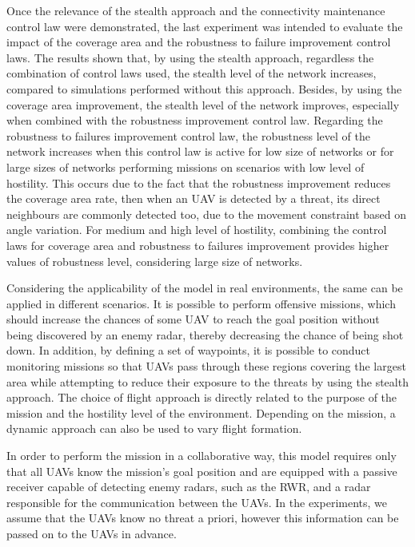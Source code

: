 Once the relevance of the stealth approach and the connectivity maintenance control law were demonstrated, the last experiment was intended to evaluate the impact of the coverage area and the robustness to failure improvement control laws. The results shown that, by using the stealth approach, regardless the combination of control laws used, the stealth level of the network increases, compared to simulations performed without this approach. Besides, by using the coverage area improvement, the stealth level of the network improves, especially when combined with the robustness improvement control law. Regarding the robustness to failures improvement control law,  the robustness level of the network increases when this control law is active for low size of networks or for large sizes of networks performing missions on scenarios with low level of hostility. This occurs due to the fact that the robustness improvement reduces the coverage area rate, then when an UAV is detected by a threat, its direct neighbours are commonly detected too, due to the movement constraint based on angle variation. For medium and high level of hostility, combining the control laws for coverage area and robustness to failures improvement provides higher values of robustness level, considering large size of networks.

Considering the applicability of the model in real environments, the same can be applied in different scenarios. It is possible to perform offensive missions, which should increase the chances of some UAV to reach the goal position without being discovered by an enemy radar, thereby decreasing the chance of being shot down. In addition, by defining a set of waypoints, it is possible to conduct monitoring missions so that UAVs pass through these regions covering the largest area while attempting to reduce their exposure to the threats by using the stealth approach. The choice of flight approach is directly related to the purpose of the mission and the hostility level of the environment. Depending on the mission, a dynamic approach can also be used to vary flight formation.

In order to perform the mission in a collaborative way, this model requires only that all UAVs know the mission's goal position and are equipped with a passive receiver capable of detecting enemy radars, such as the RWR, and a radar responsible for the communication between the UAVs. In the experiments, we assume that the UAVs know no threat a priori, however this information can be passed on to the UAVs in advance.

